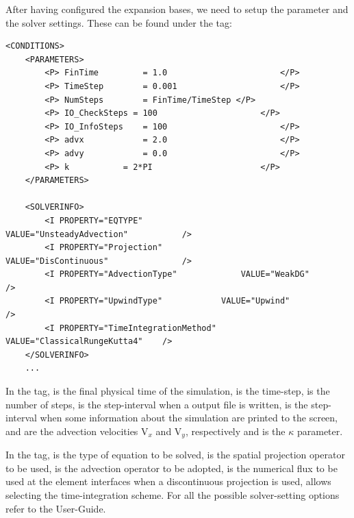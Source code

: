 After having configured the expansion bases, we need to setup the parameter and the solver 
settings. These can be found under the  tag:
%
\begin{lstlisting}[style=XMLStyle]
<CONDITIONS>
    <PARAMETERS>
        <P> FinTime  		= 1.0               		</P>
        <P> TimeStep 		= 0.001             		</P>
        <P> NumSteps 		= FinTime/TimeStep </P>
        <P> IO_CheckSteps = 100               		</P>
        <P> IO_InfoSteps 	= 100               		</P>
        <P> advx 			= 2.0               		</P>
        <P> advy 			= 0.0               		</P>
        <P> k 			= 2*PI              		</P>
    </PARAMETERS>
        
    <SOLVERINFO>
        <I PROPERTY="EQTYPE"                		VALUE="UnsteadyAdvection"   		/>
        <I PROPERTY="Projection"            		VALUE="DisContinuous"       		/>
        <I PROPERTY="AdvectionType"      		VALUE="WeakDG"              		/>
        <I PROPERTY="UpwindType"           	VALUE="Upwind"              		/>
        <I PROPERTY="TimeIntegrationMethod" 	VALUE="ClassicalRungeKutta4"	/>
    </SOLVERINFO>
    ...
\end{lstlisting}
%
In the  tag,  is the final physical time of the simulation, 
 is the time-step,  is the number of steps,  
is the step-interval when a output file is written,  is the step-interval when 
some information about the simulation are printed to the screen,  and  
are the advection velocities V$_{x}$ and V$_{y}$, respectively and  is the $\kappa$ 
parameter.

In the  tag,  is the type of equation to be solved,  
is the spatial projection operator to be used,  is the advection operator 
to be adopted,  is the numerical flux to be used at the element interfaces 
when a discontinuous projection is used,  allows selecting the 
time-integration scheme. For all the possible solver-setting options refer to the User-Guide.

